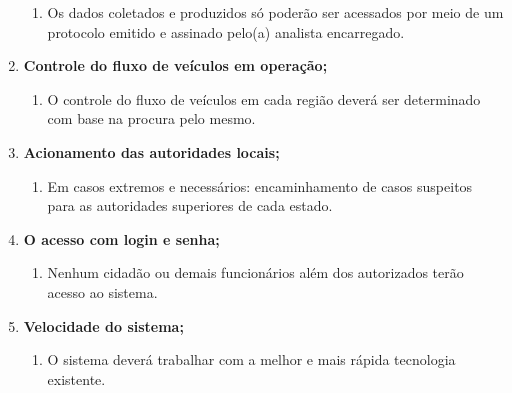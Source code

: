 \begin{enumerate}
\begin{enumerate}
                  \item	Os dados coletados  e produzidos só poderão ser acessados por meio de um protocolo emitido e assinado pelo(a) analista encarregado.



            \end{enumerate}

      \item \textbf{Controle do fluxo de veículos em operação; }
            \begin{enumerate}

                  \item	O controle do fluxo de veículos em cada região deverá ser determinado com base na procura pelo mesmo.



            \end{enumerate}

      \item \textbf{Acionamento das autoridades locais;}
            \begin{enumerate}

                  \item	Em casos extremos e necessários: encaminhamento de casos suspeitos para as autoridades superiores de cada estado.



            \end{enumerate}

      \item \textbf{O acesso com login e senha;}
            \begin{enumerate}

                  \item	Nenhum cidadão ou demais funcionários além dos autorizados terão acesso ao sistema.


            \end{enumerate}

      \item \textbf{Velocidade do sistema;}
            \begin{enumerate}

                  \item	O sistema deverá trabalhar com a melhor e mais rápida tecnologia existente.




\end{enumerate}
\end{enumerate}
